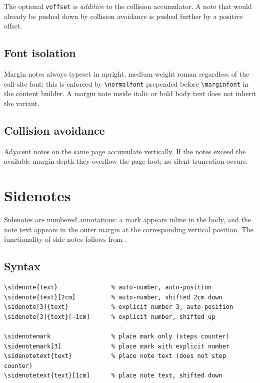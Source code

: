 \documentclass[11pt, twoside, openany]{book}
\newcommand{\cmd}[1]{\texttt{\textbackslash #1}}
\begin{document}
The optional \texttt{voffset} is \emph{additive} to the collision accumulator. A note that would already be pushed down by collision avoidance is pushed further by a positive offset.

\subsection{Font isolation}\label{subsec:marginnotesfont}

Margin notes always typeset in upright, medium-weight roman regardless of the call-site font; this is enforced by \cmd{normalfont} prepended before \cmd{marginfont} in the content builder. A margin note inside italic or bold body text does not inherit the variant.

\subsection{Collision avoidance}\label{subsec:marginnotescollision}

Adjacent notes on the same page accumulate vertically. If the notes exceed the available margin depth they overflow the page foot; no silent truncation occurs.

\section{Sidenotes}\label{sec:sidenotes}

Sidenotes are numbered annotations: a mark appears inline in the body, and the note text appears in the outer margin at the corresponding vertical position. The functionality of side notes follows from \cite{sidenotes}.

\subsection{Syntax}\label{subsec:sidenotessyntax}

\begin{verbatim}
\sidenote{text}               % auto-number, auto-position
\sidenote{text}[2cm]          % auto-number, shifted 2cm down
\sidenote[3]{text}            % explicit number 3, auto-position
\sidenote[3]{text}[-1cm]      % explicit number, shifted up

\sidenotemark                 % place mark only (steps counter)
\sidenotemark[3]              % place mark with explicit number
\sidenotetext{text}           % place note text (does not step counter)
\sidenotetext{text}[1cm]      % place note text, shifted down
\end{verbatim}
\end{document}
